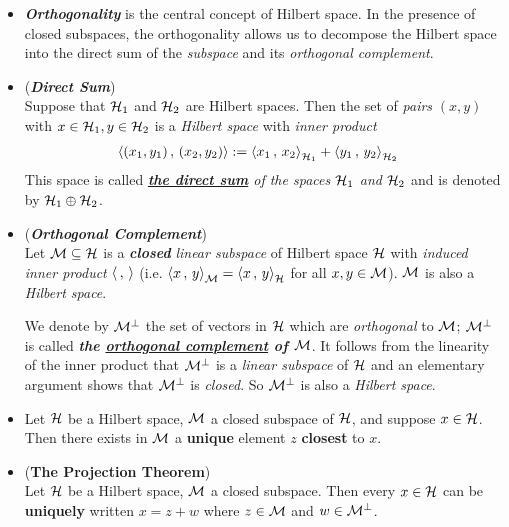 \documentclass[11pt]{article}
\begin{document}
\begin{itemize}
\item \begin{remark}
\emph{\textbf{Orthogonality}} is the central concept of Hilbert space. In the presence of closed subspaces, the orthogonality allows us to decompose the Hilbert space into the direct sum of the \emph{subspace} and its \emph{orthogonal complement}.
\end{remark}


\item \begin{definition} (\emph{\textbf{Direct Sum}})\\
Suppose that ${\mathcal H}_1$ and ${\mathcal H}_2$ are Hilbert spaces. Then the set of \emph{pairs} $(x, y)$ with $x \in {\mathcal H}_1, y \in {\mathcal H}_2$ is a \emph{Hilbert space} with \emph{inner
product}
\begin{align*}
\left\langle (x_1, y_1)\,,\, (x_2, y_2) \right\rangle &:= \left\langle x_1\,,\, x_2 \right\rangle_{{\mathcal H}_1} + \left\langle y_1\,,\, y_2 \right\rangle_{{\mathcal H}_2}
\end{align*}
This space is called \emph{\underline{\textbf{the direct sum}} of the spaces ${\mathcal H}_1$ and ${\mathcal H}_2$} and is denoted by ${\mathcal H}_1 \oplus {\mathcal H}_2$.
\end{definition}

\item \begin{definition} (\emph{\textbf{Orthogonal Complement}})\\
Let ${\mathcal M} \subseteq {\mathcal H}$ is a \emph{\textbf{closed}} \emph{linear subspace} of Hilbert space ${\mathcal H}$ with \emph{induced inner product} $\left\langle \,,\,  \right\rangle$ (i.e. $\left\langle x\,,\, y \right\rangle_{{\mathcal M}} = \left\langle x\,,\, y \right\rangle_{{\mathcal H}}$ for all $x, y \in {\mathcal M}$). ${\mathcal M}$ is also a \emph{Hilbert space}.

We denote by ${\mathcal M}^{\bot}$ the set of vectors in ${\mathcal H}$ which are \emph{orthogonal} to ${\mathcal M}$;  ${\mathcal M}^{\bot}$ is called \emph{\textbf{the \underline{orthogonal complement} of ${\mathcal M}$}}. It follows from the linearity of the inner product that ${\mathcal M}^{\bot}$ is a \emph{linear subspace} of ${\mathcal H}$ and an elementary argument shows that ${\mathcal M}^{\bot}$ is \emph{closed}. So ${\mathcal M}^{\bot}$ is also a \emph{Hilbert space}.
\end{definition}

\item \begin{lemma}
Let ${\mathcal H}$ be a Hilbert space, ${\mathcal M}$ a closed subspace of ${\mathcal H}$, and suppose $x \in {\mathcal H}$. Then there exists in ${\mathcal M}$ a \textbf{unique} element $z$ \textbf{closest} to $x$.
\end{lemma}

\item \begin{theorem} (\textbf{The Projection Theorem})\\
Let ${\mathcal H}$ be a Hilbert space, ${\mathcal M}$ a closed subspace. Then every $x \in {\mathcal H}$ can be \textbf{uniquely} written $x = z + w$ where $z \in {\mathcal M}$ and $w \in {\mathcal M}^{\bot}$.
\end{theorem}


\end{itemize}
\end{document}

